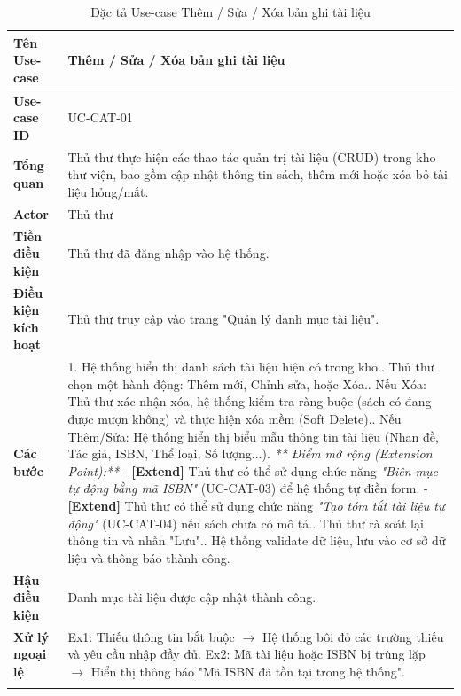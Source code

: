 \begin{longtable}{|p{3.5cm}|p{11.5cm}|}
    \hline
    \textbf{Tên Use-case} & \textbf{Thêm / Sửa / Xóa bản ghi tài liệu} \\
    \hline
    \textbf{Use-case ID} & UC-CAT-01 \\
    \hline
    \textbf{Tổng quan} & Thủ thư thực hiện các thao tác quản trị tài liệu (CRUD) trong kho thư viện, bao gồm cập nhật thông tin sách, thêm mới hoặc xóa bỏ tài liệu hỏng/mất. \\
    \hline
    \textbf{Actor} & Thủ thư \\
    \hline
    \textbf{Tiền điều kiện} & Thủ thư đã đăng nhập vào hệ thống. \\
    \hline
    \textbf{Điều kiện kích hoạt} & Thủ thư truy cập vào trang "Quản lý danh mục tài liệu". \\
    \hline
    \textbf{Các bước} & 
    1. Hệ thống hiển thị danh sách tài liệu hiện có trong kho.\newline
    2. Thủ thư chọn một hành động: Thêm mới, Chỉnh sửa, hoặc Xóa.\newline
    3. Nếu Xóa: Thủ thư xác nhận xóa, hệ thống kiểm tra ràng buộc (sách có đang được mượn không) và thực hiện xóa mềm (Soft Delete).\newline
    4. Nếu Thêm/Sửa: Hệ thống hiển thị biểu mẫu thông tin tài liệu (Nhan đề, Tác giả, ISBN, Thể loại, Số lượng...).\newline
    \textit{** Điểm mở rộng (Extension Point):**}\newline
    - \textbf{[Extend]} Thủ thư có thể sử dụng chức năng \textit{"Biên mục tự động bằng mã ISBN"} (UC-CAT-03) để hệ thống tự điền form.\newline
    - \textbf{[Extend]} Thủ thư có thể sử dụng chức năng \textit{"Tạo tóm tắt tài liệu tự động"} (UC-CAT-04) nếu sách chưa có mô tả.\newline
    5. Thủ thư rà soát lại thông tin và nhấn "Lưu".\newline
    6. Hệ thống validate dữ liệu, lưu vào cơ sở dữ liệu và thông báo thành công. \\
    \hline
    \textbf{Hậu điều kiện} & Danh mục tài liệu được cập nhật thành công. \\
    \hline
    \textbf{Xử lý ngoại lệ} & 
    Ex1: Thiếu thông tin bắt buộc $\rightarrow$ Hệ thống bôi đỏ các trường thiếu và yêu cầu nhập đầy đủ.\newline
    Ex2: Mã tài liệu hoặc ISBN bị trùng lặp $\rightarrow$ Hiển thị thông báo "Mã ISBN đã tồn tại trong hệ thống". \\
    \hline
    \caption{Đặc tả Use-case Thêm / Sửa / Xóa bản ghi tài liệu}
\end{longtable}

